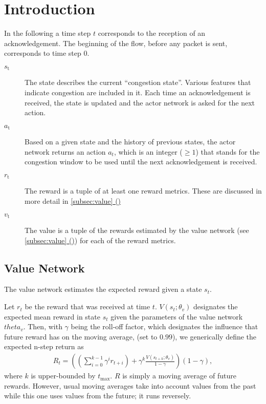 \documentclass[sigconf]{acmart}
\newcommand*{\fullref}[1]{\hyperref[{#1}]{\autoref*{#1} (\nameref*{#1})}} %
\begin{document}




\maketitle

\section{Introduction}

In the following a time step $t$ corresponds to the reception of an acknowledgement. The beginning of the flow, before any packet is sent, corresponds to time step $0$.

\begin{description}
\item[$\textit{s}_\text{t}$] The state  describes the current ``congestion state''. Various features that indicate congestion are included in it. Each time an acknowledgement is received, the state is updated and the actor network is asked for the next action. 
\item[$\textit{a}_\text{t}$] Based on a given state and the history of previous states, the actor network returns an action $a_t$, which is an integer ($\geq 1$) that stands for the congestion window to be used until the next acknowledgement is received. 
\item[$\textit{r}_\text{t}$] The reward is a tuple of at least one reward metrics. These are discussed in more detail in \fullref{subsec:value}
\item[$\textit{v}_\text{t}$] The value is a tuple of the rewards estimated by the value network (see \fullref{subsec:value}) for each of the reward metrics. 
\end{description}

\subsection{Value Network}
\label{subsec:value}

The value network estimates the expected reward given a state $s_t$.

Let $r_t$ be the reward that was received at time $t$. $V(s_t; \theta_v)$ designates the expected mean reward in state $s_t$ given the parameters of the value network $theta_v$. Then, with $\gamma$ being the roll-off factor, which designates the influence that future reward has on the moving average, (set to $0.99$), we generically define the expected n-step return as 
\begin{align*}
R_t = \left(\left(\sum_{i=0}^{k-1} \gamma^ir_{t+i}\right) + \gamma^k \frac{V(s_{t+k}; \theta_v)}{1-\gamma}\right)\left(1-\gamma\right),
\end{align*}
where $k$ is upper-bounded by $t_\text{max}$. $R$ is simply a moving average of future rewards. However, usual moving averages take into account values from the past while this one uses values from the future; it runs reversely. 
\end{document}
